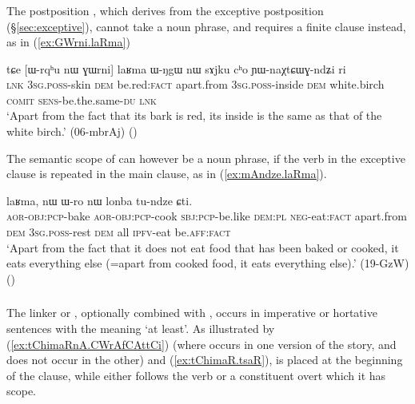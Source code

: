 \subsubsection{}
The postposition , which derives from the exceptive postposition  (§\ref{sec:exceptive}), cannot take a noun phrase, and requires a finite clause instead, as in (\ref{ex:GWrni.laRma})

\begin{exe}
\ex \label{ex:GWrni.laRma}
\gll tɕe [ɯ-rqʰu nɯ ɣɯrni] laʁma ɯ-ŋgɯ nɯ sɤjku cʰo ɲɯ-naχtɕɯɣ-ndʑi ri \\
\textsc{lnk} \textsc{3sg}.\textsc{poss}-skin \textsc{dem} be.red:\textsc{fact} apart.from \textsc{3sg}.\textsc{poss}-inside \textsc{dem} white.birch \textsc{comit} \textsc{sens}-be.the.same-\textsc{du} \textsc{lnk} \\
\glt `Apart from the fact that its bark is red, its inside is the same as that of the white birch.' (06-mbrAj)
()
\end{exe} 

The semantic scope of  can however be a noun phrase, if the verb in the exceptive clause is repeated in the main clause, as in (\ref{ex:mAndze.laRma}).

\begin{exe}
\ex \label{ex:mAndze.laRma}
 laʁma, nɯ ɯ-ro nɯ lonba tu-ndze ɕti. \\
\textsc{aor}-\textsc{obj}:\textsc{pcp}-bake \textsc{aor}-\textsc{obj}:\textsc{pcp}-cook  \textsc{sbj}:\textsc{pcp}-be.like \textsc{dem}:\textsc{pl} \textsc{neg}-eat:\textsc{fact} apart.from \textsc{dem} \textsc{3sg}.\textsc{poss}-rest \textsc{dem} all \textsc{ipfv}-eat be.\textsc{aff}:\textsc{fact} \\
\glt `Apart from the fact that it does not eat food that has been baked or cooked, it eats everything else (=apart from cooked food, it eats everything else).' (19-GzW)
()
\end{exe} 

\subsubsection{}
The linker  or , optionally combined with , occurs in imperative or hortative sentences with the meaning `at least'. As illustrated by (\ref{ex:tChimaRnA.CWrAfCAttCi}) (where  occurs in one version of the story, and does not occur in the other) and (\ref{ex:tChimaR.tsaR}),  is placed at the beginning of the clause, while  either follows the verb or a constituent overt which it has scope.


